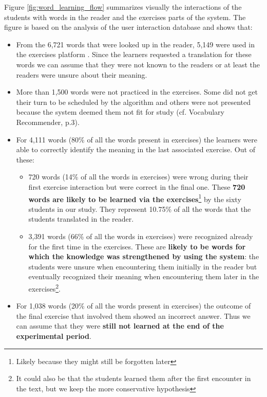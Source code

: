   Figure \ref{fig:word_learning_flow} summarizes visually the interactions of the students with words in the reader and the exercises parts of the system. The figure is based on the analysis of the user interaction database and shows that: 

  \begin{itemize}
    \item From the 6,721 words that were looked up in the reader, 5,149 were used in the exercises platform \cite{Avagyan17a-blocks}. Since the learners requested a translation for these words we can assume that they were not known to the readers or at least the readers were unsure about their meaning. 

    \item More than 1,500 words were not practiced in the exercises. 
    Some did not get their turn to be scheduled by the algorithm and others were not presented because the system deemed them not fit for study (cf. Vocabulary Recommender, p.3). 

    \item For 4,111 words (80\% of all the words present in exercises) the learners were able to correctly identify the meaning in the last associated exercise. Out of these: 

    \begin{itemize}
      \item 720 words (14\% of all the words in exercises) were wrong during their first exercise interaction but were correct in the final one. These {\bf 720 words are likely to be learned via the exercises}\footnote{Likely because they might still be forgotten later} by the sixty students in our study. They represent 10.75\% of all the words that the students translated in the reader.

      \item 3,391 words (66\% of all the words in exercises) were recognized already for the first time in the exercises. These are {\bf likely to be words for which the knowledge was strengthened by using the system}: the students were unsure when encountering them initially in the reader but eventually recognized their meaning when encountering them later in the exercises\footnote{It could also be that the students learned them after the first encounter in the text, but we keep the more conservative hypothesis}. 
    \end{itemize}

  \item For 1,038 words (20\% of all the words present in exercises) the outcome of the final exercise that involved them showed an incorrect answer. Thus we can assume that they were {\bf still not learned at the end of the experimental period}.

  \end{itemize}

